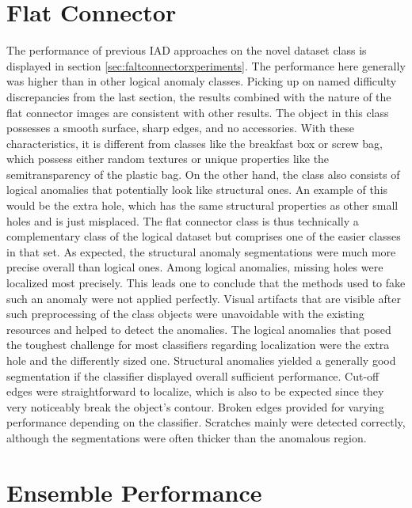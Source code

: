\section{Flat Connector}
\label{sec:flatconnectordiscussion}

The performance of previous IAD approaches on the novel dataset class is displayed in section \ref{sec:faltconnectorxperiments}. The performance here generally was higher 
than in other logical anomaly classes. Picking up on named difficulty discrepancies from the last section, the results combined with the nature of the flat connector images 
are consistent with other results. The object in this class possesses a smooth surface, sharp edges, and no accessories. With these 
characteristics, it is different from classes like the breakfast box or screw bag, which possess either random textures or unique properties 
like the semitransparency of the plastic bag. On the other hand, the class also consists of logical anomalies that potentially look 
like structural ones. An example of this would be the extra hole, which has the same structural properties as other small holes and is 
just misplaced. The flat connector class is thus technically a complementary class of the logical dataset but comprises 
one of the easier classes in that set. \newline
As expected, the structural anomaly segmentations were much more precise overall than logical ones. Among logical anomalies, 
missing holes were localized most precisely. This leads one to conclude that the methods used to fake such an anomaly were not applied perfectly. 
Visual artifacts that are visible after such preprocessing of the class objects were unavoidable with the existing resources and  
helped to detect the anomalies. The logical anomalies that posed the toughest challenge for most classifiers regarding localization 
were the extra hole and the differently sized one. \newline
Structural anomalies yielded a generally good segmentation if the classifier displayed overall sufficient performance. Cut-off edges were straightforward to localize, which is also to be expected since they very noticeably break the object's contour. Broken edges provided for 
varying performance depending on the classifier. Scratches mainly were detected correctly, although the segmentations were often 
thicker than the anomalous region.



\section{Ensemble Performance}
\label{sec:ensemblediscussion}

